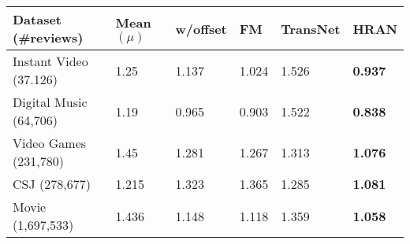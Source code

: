 \begin{table}[t]
    \centering
    \begin{tabular}{@{}llllll@{}}
    \toprule
    Dataset  (\#reviews)        & Mean $(\mu)$  & w/offset & FM 	& TransNet & HRAN  \\ \midrule
    Instant Video  (37.126)     & 1.25 			&  1.137   &    1.024   & 1.526 	&\textbf{0.937} \\
    Digital Music (64,706)      & 1.19	 		&   0.965  &    0.903 	& 1.522 	& \textbf{0.838}  \\
    Video Games  (231,780)      & 1.45	 		&   1.281  & 	1.267  	& 1.313  	&  \textbf{1.076} \\
    CSJ (278,677)               & 1.215 		&   1.323  &    1.365	& 1.285 	&  \textbf{1.081} \\
    Movie (1,697,533)           & 1.436	 		&   1.148  &    1.118 	& 1.359  	& \textbf{1.058} \\
    \bottomrule
    \end{tabular}
     \label{tab:recoRMSE}
\end{table}